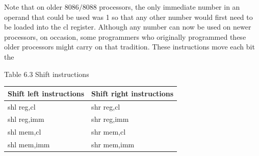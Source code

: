 \documentclass[10pt]{book}
\begin{document}
Note that on older $8086 / 8088$ processors, the only immediate number in an operand that could be used was 1 so that any other number would first need to be loaded into the cl register. Although any number can now be used on newer processors, on occasion, some programmers who originally programmed these older processors might carry on that tradition. These instructions move each bit the

Table 6.3 Shift instructions

\begin{center}
\begin{tabular}{ll}
Shift left instructions & Shift right instructions \\
\hline
shl reg,cl & shr reg,cl \\
shl reg,imm & shr reg,imm \\
shl mem,cl & shr mem,cl \\
shl mem,imm & shr mem,imm \\
\end{tabular}
\end{center}
\end{document}
